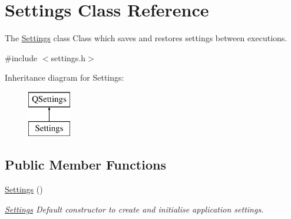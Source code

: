 \hypertarget{class_settings}{}\section{Settings Class Reference}
\label{class_settings}


The \hyperlink{class_settings}{Settings} class Class which saves and restores settings between executions.  




{\ttfamily \#include $<$settings.\+h$>$}

Inheritance diagram for Settings\+:\begin{figure}[H]
\begin{center}
\leavevmode
\includegraphics[height=2.000000cm]{class_settings}
\end{center}
\end{figure}
\subsection*{Public Member Functions}
\begin{DoxyCompactItemize}
\item 
\mbox{\label{class_settings_ab7169a6eefce79566dd07db3b1e5e967}} 
\hyperlink{class_settings_ab7169a6eefce79566dd07db3b1e5e967}{Settings} ()
\begin{DoxyCompactList}\small\item\em \hyperlink{class_settings}{Settings} Default constructor to create and initialise application settings. \end{DoxyCompactList}\end{DoxyCompactItemize}
